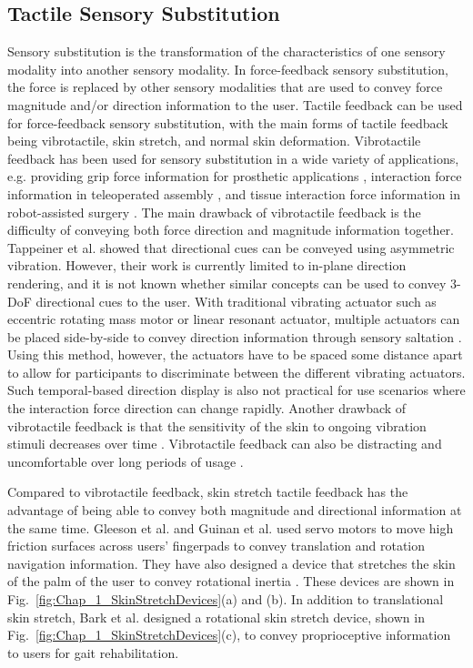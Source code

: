 \subsection{Tactile Sensory Substitution}
Sensory substitution is the transformation of the characteristics of one sensory modality into another sensory modality. In force-feedback sensory substitution, the force is replaced by other sensory modalities that are used to convey force magnitude and/or direction information to the user. Tactile feedback can be used for force-feedback sensory substitution, with the main forms of tactile feedback being vibrotactile, skin stretch, and normal skin deformation. Vibrotactile feedback has been used for sensory substitution in a wide variety of applications, e.g. providing grip force information for prosthetic applications \cite{Walker2014}, interaction force information in teleoperated assembly \cite{Debus2001}, and tissue interaction force information in robot-assisted surgery \cite{Schoonmaker2006}. The main drawback of vibrotactile feedback is the difficulty of conveying both force direction and magnitude information together. Tappeiner et al. \cite{Tappeiner2009} showed that directional cues can be conveyed using asymmetric vibration. However, their work is currently limited to in-plane direction rendering, and it is not known whether similar concepts can be used to convey 3-DoF directional cues to the user. With traditional vibrating actuator such as eccentric rotating mass motor or linear resonant actuator, multiple actuators can be placed side-by-side to convey direction information through sensory saltation \cite{Weber2011}. Using this method, however, the actuators have to be spaced some distance apart to allow for participants to discriminate between the different vibrating actuators. Such temporal-based direction display is also not practical for use scenarios where the interaction force direction can change rapidly. Another drawback of vibrotactile feedback is that the sensitivity of the skin to ongoing vibration stimuli decreases over time \cite{Bensma2005}. Vibrotactile feedback can also be distracting and uncomfortable over long periods of usage \cite{Okamoto2011}.

Compared to vibrotactile feedback, skin stretch tactile feedback has the advantage of being able to convey both magnitude and directional information at the same time. Gleeson et al. \cite{Gleeson2010} and Guinan et al. \cite{Guinan2012} used servo motors to move high friction surfaces across users' fingerpads to convey translation and rotation navigation information. They have also designed a device that stretches the skin of the palm of the user to convey rotational inertia \cite{Guinan2014}. These devices are shown in Fig.~\ref{fig:Chap_1_SkinStretchDevices}(a) and (b). In addition to translational skin stretch, Bark et al. \cite{Bark2010} designed a rotational skin stretch device, shown in Fig.~\ref{fig:Chap_1_SkinStretchDevices}(c), to convey proprioceptive information to users for gait rehabilitation. 

